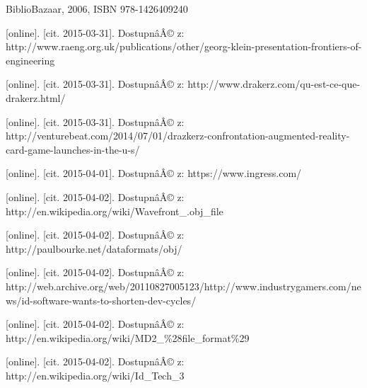 \documentclass[twoside,12pt]{article}
\begin{document}
% 
% 
\begin{literatura}

 {
	BiblioBazaar, 2006, ISBN 978-1426409240
}


{
	 [online]. [cit. 2015-03-31]. DostupnâÂ© z: 		http://www.raeng.org.uk/publications/other/georg-klein-presentation-frontiers-of-engineering
}

{
	 [online]. [cit. 2015-03-31]. DostupnâÂ© z: http://www.drakerz.com/qu-est-ce-que-drakerz.html/
}

{
	 [online]. [cit. 2015-03-31]. DostupnâÂ© z: http://venturebeat.com/2014/07/01/drazkerz-confrontation-augmented-reality-card-game-launches-in-the-u-s/
}

{
	 [online]. [cit. 2015-04-01]. DostupnâÂ© z: https://www.ingress.com/
}

{
	 [online]. [cit. 2015-04-02]. DostupnâÂ© z: http://en.wikipedia.org/wiki/Wavefront\_.obj\_file
}

{
	 [online]. [cit. 2015-04-02]. DostupnâÂ© z: http://paulbourke.net/dataformats/obj/
}

{
	 [online]. [cit. 2015-04-02]. DostupnâÂ© z: http://web.archive.org/web/20110827005123/http://www.industrygamers.com/news/id-software-wants-to-shorten-dev-cycles/
}

{
	 [online]. [cit. 2015-04-02]. DostupnâÂ© z: http://en.wikipedia.org/wiki/MD2\_\%28file\_format\%29
}

{
	 [online]. [cit. 2015-04-02]. DostupnâÂ© z: http://en.wikipedia.org/wiki/Id\_Tech\_3
}


\end{literatura}
\end{document}
